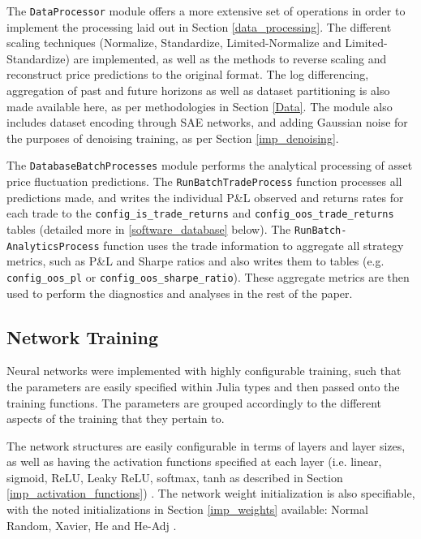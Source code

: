 \documentclass[a4paper,11pt,oneside]{article}
\theoremstyle{plain}
\theoremstyle{definition}
\begin{document}
	The \texttt{DataProcessor} module \citep{DCDataProcessor} offers a more extensive set of operations in order to implement the processing laid out in Section \ref{data_processing}. The different scaling techniques (Normalize, Standardize, Limited-Normalize and Limited-Standardize) are implemented, as well as the methods to reverse scaling and reconstruct price predictions to the original format. The log differencing, aggregation of past and future horizons as well as dataset partitioning is also made available here, as per methodologies in Section \ref{Data}. The module also includes dataset encoding through SAE networks, and adding Gaussian noise for the purposes of denoising training, as per Section \ref{imp_denoising}.\newline
		
	The \texttt{DatabaseBatchProcesses} module \citep{DCDatabaseBatchProcesses} performs the analytical processing of asset price fluctuation predictions. The \texttt{RunBatchTradeProcess} function processes all predictions made, and writes the individual P\&L observed and returns rates for each trade to the \texttt{config\_is\_trade\_returns} and \texttt{config\_oos\_trade\_returns} tables (detailed more in \ref{software_database} below). The \texttt{RunBatch-}  \texttt{AnalyticsProcess} function uses the trade information to aggregate all strategy metrics, such as P\&L and Sharpe ratios and also writes them to tables (e.g. \texttt{config\_oos\_pl} or \texttt{config\_oos\_sharpe\_ratio}). These aggregate metrics are then used to perform the diagnostics and analyses in the rest of the paper.
	
	\subsection{Network Training}
	
	Neural networks were implemented with highly configurable training, such that the parameters are easily specified within Julia types \citep{DCTrainingStructures} and then passed onto the training functions. The parameters are grouped accordingly to the different aspects of the training that they pertain to. \newline
	
	The network structures are easily configurable in terms of layers and layer sizes, as well as having the activation functions specified at each layer (i.e. linear, sigmoid, ReLU, Leaky ReLU, softmax, tanh as described in Section \ref{imp_activation_functions}) \citep{DCActivationFunctions}. The network weight initialization is also specifiable, with the noted initializations in Section \ref{imp_weights} available: Normal Random, Xavier, He and He-Adj \citep{DCInitializationFunctions}.\newline
	
\end{document}
